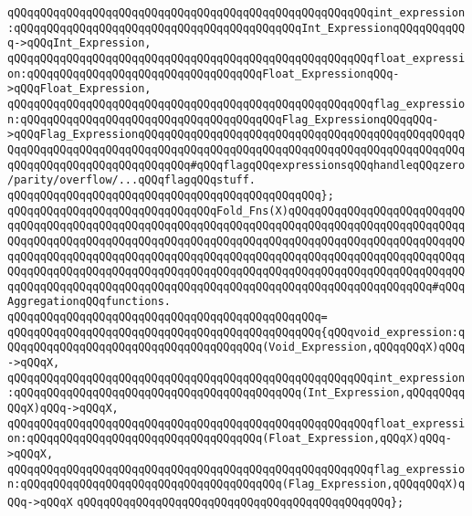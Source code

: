 \verb|qQQqqQQqqQQqqQQqqQQqqQQqqQQqqQQqqQQqqQQqqQQqqQQqqQQqqQQqint_expression:qQQqqQQqqQQqqQQqqQQqqQQqqQQqqQQqqQQqqQQqqQQqInt_ExpressionqQQqqQQqqQQq->qQQqInt_Expression,|\newline
\verb|qQQqqQQqqQQqqQQqqQQqqQQqqQQqqQQqqQQqqQQqqQQqqQQqqQQqqQQqfloat_expression:qQQqqQQqqQQqqQQqqQQqqQQqqQQqqQQqqQQqFloat_ExpressionqQQq->qQQqFloat_Expression,|\newline
\verb|qQQqqQQqqQQqqQQqqQQqqQQqqQQqqQQqqQQqqQQqqQQqqQQqqQQqqQQqflag_expression:qQQqqQQqqQQqqQQqqQQqqQQqqQQqqQQqqQQqqQQqFlag_ExpressionqQQqqQQq->qQQqFlag_ExpressionqQQqqQQqqQQqqQQqqQQqqQQqqQQqqQQqqQQqqQQqqQQqqQQqqQQqqQQqqQQqqQQqqQQqqQQqqQQqqQQqqQQqqQQqqQQqqQQqqQQqqQQqqQQqqQQqqQQqqQQqqQQqqQQqqQQqqQQqqQQqqQQqqQQq#qQQqflagqQQqexpressionsqQQqhandleqQQqzero/parity/overflow/...qQQqflagqQQqstuff.|\newline
\verb|qQQqqQQqqQQqqQQqqQQqqQQqqQQqqQQqqQQqqQQqqQQqqQQq};|\newline
\newline
\verb|qQQqqQQqqQQqqQQqqQQqqQQqqQQqqQQqFold_Fns(X)qQQqqQQqqQQqqQQqqQQqqQQqqQQqqQQqqQQqqQQqqQQqqQQqqQQqqQQqqQQqqQQqqQQqqQQqqQQqqQQqqQQqqQQqqQQqqQQqqQQqqQQqqQQqqQQqqQQqqQQqqQQqqQQqqQQqqQQqqQQqqQQqqQQqqQQqqQQqqQQqqQQqqQQqqQQqqQQqqQQqqQQqqQQqqQQqqQQqqQQqqQQqqQQqqQQqqQQqqQQqqQQqqQQqqQQqqQQqqQQqqQQqqQQqqQQqqQQqqQQqqQQqqQQqqQQqqQQqqQQqqQQqqQQqqQQqqQQqqQQqqQQqqQQqqQQqqQQqqQQqqQQqqQQqqQQqqQQqqQQqqQQqqQQqqQQqqQQqqQQqqQQqqQQqqQQq#qQQqAggregationqQQqfunctions.|\newline
\verb|qQQqqQQqqQQqqQQqqQQqqQQqqQQqqQQqqQQqqQQqqQQqqQQq=|\newline
\verb|qQQqqQQqqQQqqQQqqQQqqQQqqQQqqQQqqQQqqQQqqQQqqQQq{qQQqvoid_expression:qQQqqQQqqQQqqQQqqQQqqQQqqQQqqQQqqQQqqQQq(Void_Expression,qQQqqQQqX)qQQq->qQQqX,|\newline
\verb|qQQqqQQqqQQqqQQqqQQqqQQqqQQqqQQqqQQqqQQqqQQqqQQqqQQqqQQqint_expression:qQQqqQQqqQQqqQQqqQQqqQQqqQQqqQQqqQQqqQQqqQQq(Int_Expression,qQQqqQQqqQQqX)qQQq->qQQqX,|\newline
\verb|qQQqqQQqqQQqqQQqqQQqqQQqqQQqqQQqqQQqqQQqqQQqqQQqqQQqqQQqfloat_expression:qQQqqQQqqQQqqQQqqQQqqQQqqQQqqQQqqQQq(Float_Expression,qQQqX)qQQq->qQQqX,|\newline
\verb|qQQqqQQqqQQqqQQqqQQqqQQqqQQqqQQqqQQqqQQqqQQqqQQqqQQqqQQqflag_expression:qQQqqQQqqQQqqQQqqQQqqQQqqQQqqQQqqQQqqQQq(Flag_Expression,qQQqqQQqX)qQQq->qQQqX|\newline
\verb|qQQqqQQqqQQqqQQqqQQqqQQqqQQqqQQqqQQqqQQqqQQqqQQq};|\newline
\newline
